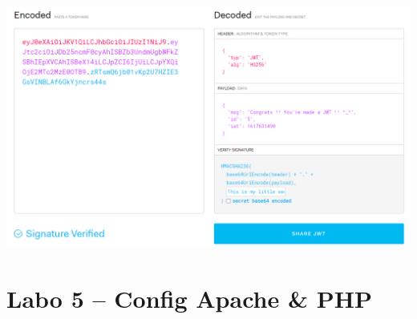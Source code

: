 \documentclass[a4paper]{article}
\begin{document}
\begin{center} \includegraphics[width=0.99\linewidth]{images/jwt-01.PNG} \end{center}

















\section{Labo 5 -- Config Apache \& PHP}
\end{document}
